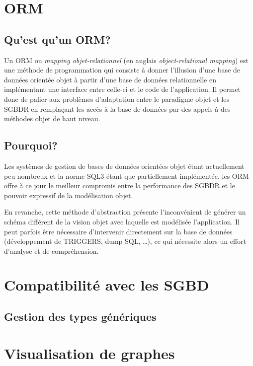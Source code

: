 \section{ORM}

	\subsection{Qu'est qu'un ORM?}
    Un ORM ou \emph{mapping objet-relationnel} (en anglais \emph{object-relational mapping}) est une méthode de programmation qui consiste à donner l'illusion d'une base de données orientée objet à partir d'une base de données relationnelle en implémentant une interface entre celle-ci et le code de l'application. Il permet donc de palier aux problèmes d'adaptation entre le paradigme objet et les SGBDR en remplaçant les accès à la base de données par des appels à des méthodes objet de haut niveau.
   
	\subsection{Pourquoi?}
    Les systèmes de gestion de bases de données orientées objet étant actuellement peu nombreux et la norme SQL3 étant que partiellement implémentée, les ORM offre à ce jour le meilleur compromis entre la performance des SGBDR et le pouvoir expressif de la modélisation objet.
    
En revanche, cette méthode d'abstraction présente l'inconvénient de générer un schéma différent de la vision objet avec laquelle est modélisée l'application. Il peut parfois être nécessaire d'intervenir directement sur la base de données (développement de TRIGGERS, dump SQL, \ldots), ce qui nécessite alors un effort d'analyse et de compréhension.

\section{Compatibilité avec les SGBD}

	\subsection{Gestion des types génériques}
	\label{section:generic_types}


\section{Visualisation de graphes}
	
